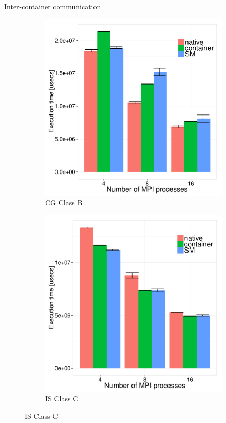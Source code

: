 \documentclass[presentation]{beamer}
\begin{document}
\begin{frame}[label=sec-3-5]{Inter-container communication}
\begin{figure}[H]
  \centering
\begin{subfigure}[b]{0.42\textwidth}
    \includegraphics[scale=0.25,angle=0]{figures/inter-container-mgC.pdf}
    \caption{CG Class B}
  \end{subfigure}
  \begin{subfigure}[b]{0.42\textwidth}
    \includegraphics[scale=0.25,angle=0]{figures/inter-container-isC.pdf}
    \caption{IS Class C}
  \end{subfigure}
\end{figure}
\end{frame}
\end{document}
